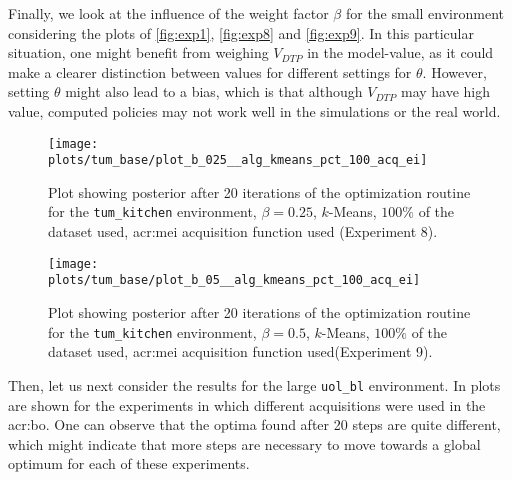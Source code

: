 \newpage
	
Finally, we look at the influence of the weight factor $\beta$ for the small environment considering the plots of \autoref{fig:exp1}, \autoref{fig:exp8} and \autoref{fig:exp9}.
In this particular situation, one might benefit from weighing $V_\mathit{DTP}$ in the model-value, as it could make a clearer distinction between values for different settings for $\theta$.
However, setting $\theta$ might also lead to a bias, which is that although $V_\mathit{DTP}$ may have high value, computed policies may not work well in the simulations or the real world.

	\begin{figure}[t!]
		\centering
		\texttt{[image: plots/tum\_base/plot\_b\_025\_\_alg\_kmeans\_pct\_100\_acq\_ei]}
		\caption{Plot showing posterior after 20 iterations of the optimization routine for the \texttt{tum\_kitchen} environment, $\beta = 0.25$, $k$-Means, $100\%$ of the dataset used, \acrshort{acr:mei} acquisition function used (Experiment 8).}
		\label{fig:exp8}
	\end{figure}
	\begin{figure}[t!]
		\centering
		\texttt{[image: plots/tum\_base/plot\_b\_05\_\_alg\_kmeans\_pct\_100\_acq\_ei]}
		\caption{Plot showing posterior after 20 iterations of the optimization routine for the \texttt{tum\_kitchen} environment, $\beta = 0.5$, $k$-Means, $100\%$ of the dataset used, \acrshort{acr:mei} acquisition function used(Experiment 9).}
		\label{fig:exp9}
	\end{figure}

Then, let us next consider the results for the large \texttt{uol\_bl} environment. In  plots are shown for the experiments in which different acquisitions were used in the \acrshort{acr:bo}.
One can observe that the optima found after 20 steps are quite different, which might indicate that more steps are necessary to move towards a global optimum for each of these experiments.

